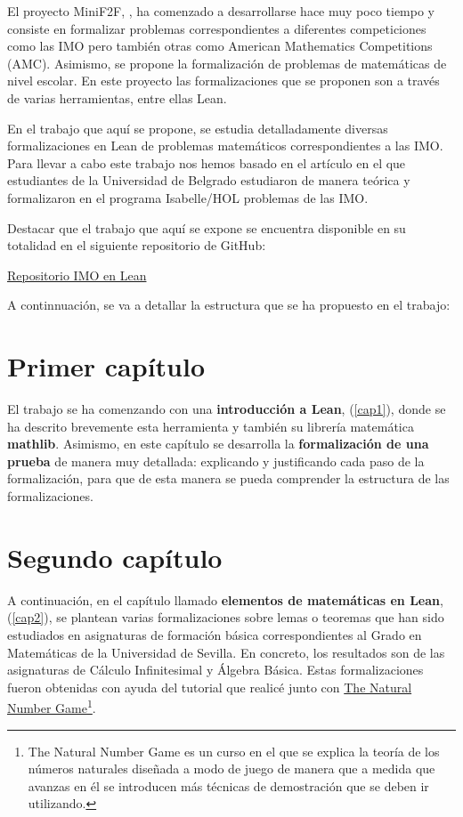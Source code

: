 El proyecto MiniF2F, \cite{mini}, ha comenzado a desarrollarse hace muy
poco tiempo y consiste en formalizar problemas correspondientes a
diferentes competiciones como las IMO pero también otras como American
Mathematics Competitions (AMC). Asimismo, se propone la formalización de
problemas de matemáticas de nivel escolar. En este proyecto las
formalizaciones que se proponen son a través de varias herramientas,
entre ellas Lean.

En el trabajo que aquí se propone, se estudia detalladamente diversas
formalizaciones en Lean de problemas matemáticos correspondientes a las
IMO. Para llevar a cabo este trabajo nos hemos basado en el artículo
\cite{ART} en el que estudiantes de la Universidad de Belgrado
estudiaron de manera teórica y formalizaron en el programa Isabelle/HOL
problemas de las IMO.

Destacar que el trabajo que aquí se expone se encuentra disponible en
su totalidad en el siguiente repositorio de GitHub:

\begin{center}
\href{https://github.com/saradiazr11/IMO_en_Lean}{Repositorio IMO en Lean}
\end{center}

A continnuación, se va a detallar la estructura que se ha propuesto en
el trabajo:

\section{Primer capítulo}

El trabajo se ha comenzando con una \textbf{introducción a Lean},
(\ref{cap1}), donde se ha descrito brevemente esta herramienta y también
su librería matemática \textbf{mathlib}. Asimismo, en este capítulo se
desarrolla la \textbf{formalización de una prueba} de manera muy
detallada: explicando y justificando cada paso de la formalización, para
que de esta manera se pueda comprender la estructura de las
formalizaciones.

\section{Segundo capítulo}

A continuación, en el capítulo llamado \textbf{elementos de matemáticas
  en Lean}, (\ref{cap2}), se plantean varias formalizaciones sobre lemas
o teoremas que han sido estudiados en asignaturas de formación básica
correspondientes al Grado en Matemáticas de la Universidad de Sevilla.
En concreto, los resultados son de las asignaturas de Cálculo
Infinitesimal y Álgebra Básica. Estas formalizaciones fueron obtenidas
con ayuda del tutorial \cite{tutor} que realicé junto con
\href{https://www.ma.imperial.ac.uk/~buzzard/xena/natural_number_game/}{The
  Natural Number Game}\footnote{The Natural Number Game es un curso en
  el que se explica la teoría de los números naturales diseñada a modo
  de juego de manera que a medida que avanzas en él se introducen más
  técnicas de demostración que se deben ir utilizando.}.

